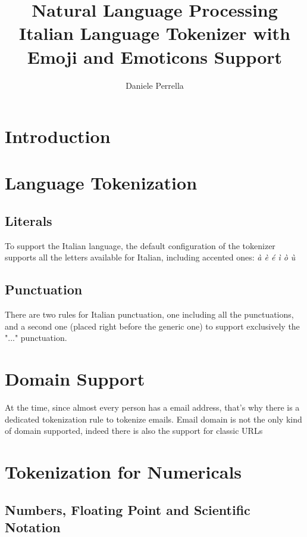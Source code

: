 \documentclass[12pt,a4paper]{report}
\title{Natural Language Processing \\ Italian Language Tokenizer with Emoji and Emoticons Support}
\author{Daniele Perrella}
\begin{document}
\maketitle
\tableofcontents

\chapter{Introduction}

\section{}

\chapter{Language Tokenization}
\section{Literals}
To support the Italian language, the default configuration of the tokenizer supports all the letters available for Italian, including accented ones: \textit{à è é ì ò ù}
\section{Punctuation}
There are two rules for Italian punctuation, one including all the punctuations, and a second one (placed right before the generic one) to support exclusively the "..." punctuation.

\chapter{Domain Support}
At the time, since almost every person has a email address, that's why there is a dedicated tokenization rule to tokenize emails. Email domain is not the only kind of domain supported, indeed there is also the support for classic URLs
\section{}

\chapter{Tokenization for Numericals}
\section{Numbers, Floating Point and Scientific Notation}
\end{document}
